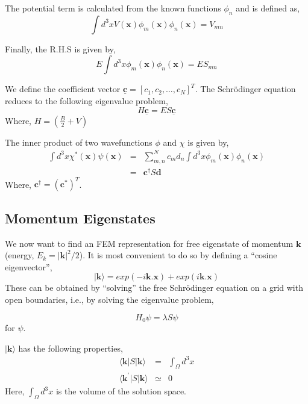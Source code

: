 \documentclass[a4paper,10pt]{report}
\begin{document}
\noindent The potential term is calculated from the known functions $\phi_n$ and is defined as,
\begin{equation}\label{potentialterm}
 \int d^3xV(\mathbf{x})\phi_m(\mathbf{x})\phi_n(\mathbf{x}) = V_{mn}
\end{equation}

\noindent Finally, the R.H.S is given by,
\begin{equation}
 E\int d^3x\phi_m(\mathbf{x})\phi_n(\mathbf{x})=ES_{mn}
\end{equation}

\noindent We define the coefficient vector $\mathbf{\underline{c}}=[c_1,c_2,\ldots,c_N]^T$. The Schrödinger equation reduces to 
the following eigenvalue problem,
\begin{equation}\label{schroedingerfem}
  H\mathbf{\underline{c}}=ES\mathbf{\underline{c}}
\end{equation}
\noindent Where, $H=\left(\frac{B}{2}+V\right)$

The inner product of two wavefunctions $\phi$ and $\chi$ is given by,
\begin{eqnarray}\label{innerproduct}
 \int d^3x \chi^*(\mathbf{x})\psi(\mathbf{x}) &=& \displaystyle\sum_{m,n}^{N}c_md_n\int d^3x \phi_m(\mathbf{x})\phi_n(\mathbf{x})\\
 &=& \mathbf{c}^{\dagger}S\mathbf{d}
\end{eqnarray}
\noindent Where, $\mathbf{c}^{\dagger}=(\mathbf{c}^*)^T$.

\subsection{Momentum Eigenstates}
We now want to find an FEM representation for free eigenstate of momentum $\mathbf{k}$ (energy,
$E_k=|\mathbf{k}|^2/2$). 
It is most convenient to do so by defining a ``cosine eigenvector'',
\begin{equation}\label{cosevec}
 |\mathbf{k}\rangle = exp(-i\mathbf{k}.\mathbf{x}) + exp(i\mathbf{k}.\mathbf{x})
\end{equation}
These can be obtained by ``solving'' the free Schrödinger equation on a grid with open
boundaries, i.e., by solving the eigenvalue problem,

\begin{equation}\label{freeschroedinger}
 H_0\psi=\lambda S\psi
\end{equation}
for $\psi$.

$|\mathbf{k}\rangle$ has the following properties,
\begin{eqnarray}
 \langle\mathbf{k}|S|\mathbf{k}\rangle &=&\int_{\Omega} d^3x\\
 \langle\mathbf{k}^{\prime}|S|\mathbf{k}\rangle &\simeq& 0
\end{eqnarray}
Here, $\int_{\Omega} d^3x$ is the volume of the solution space.
\end{document}
